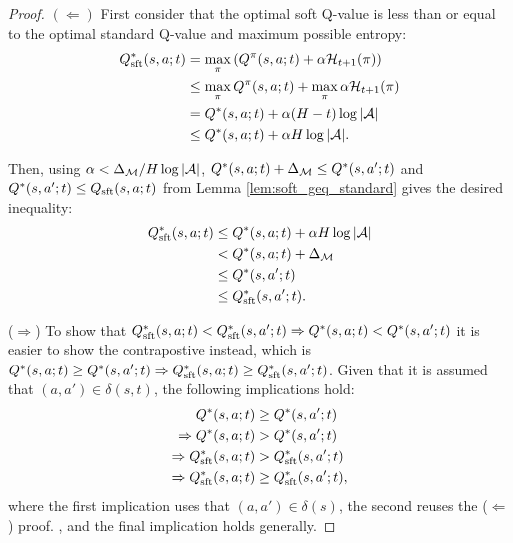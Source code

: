     \begin{proof}
        $(\Leftarrow)$ First consider that the optimal soft Q-value is less than or equal to the optimal standard Q-value and maximum possible entropy:
        \begin{align}
            Q_{\textnormal{sft}}^*(s,a;t) &= \max_\pi \left(Q^{\pi}(s,a;t) + \alpha\mathcal{H}_{t+1}(\pi)\right) \\
                &\leq \max_\pi Q^{\pi}(s,a;t) + \max_\pi \alpha\mathcal{H}_{t+1}(\pi) \label{appeq:softdiv} \\
                &= Q^*(s,a;t) + \alpha (H-t)\log |\mathcal{A}| \\
                &\leq Q^*(s,a;t) + \alpha H\log |\mathcal{A}|.
        \end{align}
        
        Then, using $\alpha < \Delta_{\mathcal{M}} / H\log |\mathcal{A}|$, $Q^*(s,a;t)+\Delta_{\mathcal{M}}\leq Q^*(s,a';t)$ and $Q^*(s,a';t)\leq Q_{{\textnormal{sft}}}(s,a;t)$ from Lemma \ref{lem:soft_geq_standard} gives the desired inequality:
        \begin{align}
            Q_{{\textnormal{sft}}}^*(s,a;t) &\leq Q^*(s,a;t) + \alpha H\log |\mathcal{A}| \\
                &< Q^*(s,a;t) + \Delta_{\mathcal{M}} \\
                &\leq Q^*(s,a';t) \\
                &\leq Q_{{\textnormal{sft}}}^*(s,a';t).
        \end{align}
        
        ($\Rightarrow$) To show that $Q_{{\textnormal{sft}}}^*(s,a;t)<Q_{{\textnormal{sft}}}^*(s,a';t) \Rightarrow Q^*(s,a;t) < Q^*(s,a';t)$ it is easier to show the contrapostive instead, which is $Q^*(s,a;t) \geq Q^*(s,a';t) \Rightarrow Q_{{\textnormal{sft}}}^*(s,a;t)\geq Q_{{\textnormal{sft}}}^*(s,a';t)$. Given that it is assumed that $(a,a')\in\delta(s,t)$, the following implications hold:
        \begin{align}
            Q^*(s,a;t) &\geq Q^*(s,a';t) \\
            \Rightarrow Q^*(s,a;t) &> Q^*(s,a';t) \\
            \Rightarrow Q_{{\textnormal{sft}}}^*(s,a;t) &> Q_{{\textnormal{sft}}}^*(s,a';t) \label{eq:reuse_proof} \\
            \Rightarrow Q_{{\textnormal{sft}}}^*(s,a;t) &\geq Q_{{\textnormal{sft}}}^*(s,a';t),
        \end{align}
        where the first implication uses that $(a,a')\in\delta(s)$, the second reuses the ($\Leftarrow$) proof. , and the final implication holds generally. 
    \end{proof}








